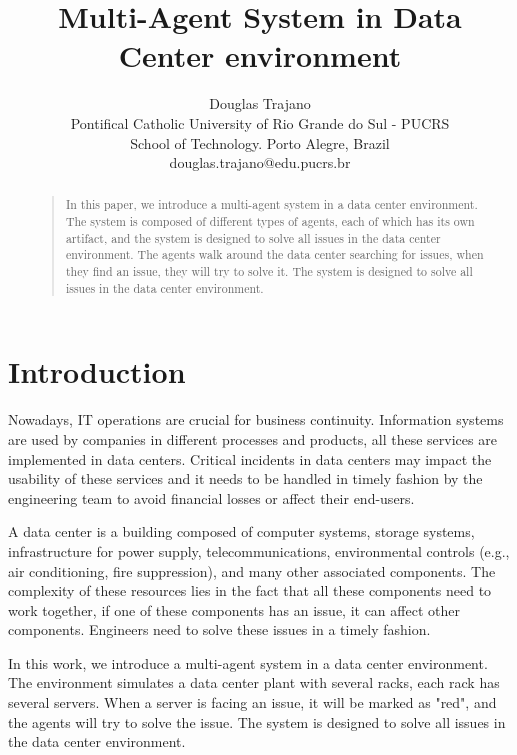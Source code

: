 \documentclass[letterpaper]{article}
\begin{document}
%
\title{Multi-Agent System in Data Center environment}
\author{Douglas Trajano\\
Pontifical Catholic University of Rio Grande do Sul - PUCRS\\
School of Technology. Porto Alegre, Brazil\\
douglas.trajano@edu.pucrs.br\\
}
\maketitle
\begin{abstract}
\begin{quote}
In this paper, we introduce a multi-agent system in a data center environment. The system is composed of different types of agents, each of which has its own artifact, and the system is designed to solve all issues in the data center environment. The agents walk around the data center searching for issues, when they find an issue, they will try to solve it. The system is designed to solve all issues in the data center environment.
\end{quote}
\end{abstract}

\section{Introduction}

Nowadays, IT operations are crucial for business continuity. Information systems are used by companies in different processes and products, all these services are implemented in data centers. Critical incidents in data centers may impact the usability of these services and it needs to be handled in timely fashion by the engineering team to avoid financial losses or affect their end-users.

A data center is a building composed of computer systems, storage systems, infrastructure for power supply, telecommunications, environmental controls (e.g., air conditioning, fire suppression), and many other associated components. The complexity of these resources lies in the fact that all these components need to work together, if one of these components has an issue, it can affect other components. Engineers need to solve these issues in a timely fashion.

In this work, we introduce a multi-agent system in a data center environment. The environment simulates a data center plant with several racks, each rack has several servers. When a server is facing an issue, it will be marked as "red", and the agents will try to solve the issue. The system is designed to solve all issues in the data center environment.
\end{document}
